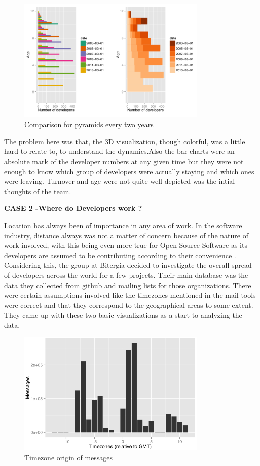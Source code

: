 \documentclass[seploa]{beavtex}
\begin{document}
\begin{figure}[!ht]
\centering
\includegraphics[width=90mm]{age1.png}
\caption{Comparison for pyramids every two years}
\end{figure}

The problem here was that, the 3D visualization, though colorful, was a little hard to relate to, to understand the dynamics.Also the bar charts were an absolute mark of the developer numbers at any given time but they were not enough to know which group of developers were actually staying and which ones were leaving. Turnover and age were not quite well depicted was the intial thoughts of the team.

 \textbf{CASE 2 -Where do Developers work ?}

Location has always been of importance in any area of work. In the software industry, distance always was not a matter of concern because of the nature of work involved, with this being even more true for Open Source Software as its developers are assumed to be contributing according to their convenience \cite{yuri2010}. Considering this, the group at Bitergia decided to investigate the overall spread of developers across the world for a few projects. Their main database was the data they collected from github and mailing lists for those organizations. There were certain assumptions involved like the timezones mentioned in the mail tools were correct and that they correspond to the geographical areas to some extent. They came up with these two basic visualizations as a start to analyzing the data.

\begin{figure}[!ht]
\centering
\includegraphics[width=90mm]{work1.png}
\caption{Timezone origin of messages}
\end{figure}
\end{document}
